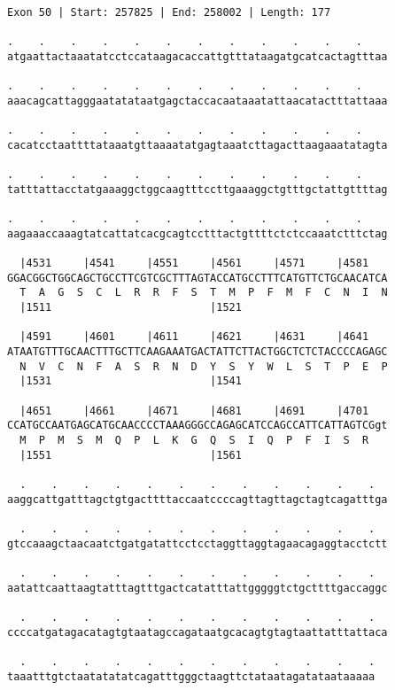 \documentclass{article}
\begin{document}
\newpage
\begin{Verbatim}[fontfamily=courier]
Exon 50 | Start: 257825 | End: 258002 | Length: 177

.    .    .    .    .    .    .    .    .    .    .    .    
atgaattactaaatatcctccataagacaccattgtttataagatgcatcactagtttaa

.    .    .    .    .    .    .    .    .    .    .    .    
aaacagcattagggaatatataatgagctaccacaataaatattaacatactttattaaa

.    .    .    .    .    .    .    .    .    .    .    .    
cacatcctaattttataaatgttaaaatatgagtaaatcttagacttaagaaatatagta

.    .    .    .    .    .    .    .    .    .    .    .    
tatttattacctatgaaaggctggcaagtttccttgaaaggctgtttgctattgttttag

.    .    .    .    .    .    .    .    .    .    .    .    
aagaaaccaaagtatcattatcacgcagtcctttactgttttctctccaaatctttctag

  |4531     |4541     |4551     |4561     |4571     |4581   
GGACGGCTGGCAGCTGCCTTCGTCGCTTTAGTACCATGCCTTTCATGTTCTGCAACATCA
  T  A  G  S  C  L  R  R  F  S  T  M  P  F  M  F  C  N  I  N
  |1511                         |1521                       

  |4591     |4601     |4611     |4621     |4631     |4641   
ATAATGTTTGCAACTTTGCTTCAAGAAATGACTATTCTTACTGGCTCTCTACCCCAGAGC
  N  V  C  N  F  A  S  R  N  D  Y  S  Y  W  L  S  T  P  E  P
  |1531                         |1541                       

  |4651     |4661     |4671     |4681     |4691     |4701   
CCATGCCAATGAGCATGCAACCCCTAAAGGGCCAGAGCATCCAGCCATTCATTAGTCGgt
  M  P  M  S  M  Q  P  L  K  G  Q  S  I  Q  P  F  I  S  R   
  |1551                         |1561                       

  .    .    .    .    .    .    .    .    .    .    .    .  
aaggcattgatttagctgtgacttttaccaatccccagttagttagctagtcagatttga

  .    .    .    .    .    .    .    .    .    .    .    .  
gtccaaagctaacaatctgatgatattcctcctaggttaggtagaacagaggtacctctt

  .    .    .    .    .    .    .    .    .    .    .    .  
aatattcaattaagtatttagtttgactcatatttattgggggtctgcttttgaccaggc

  .    .    .    .    .    .    .    .    .    .    .    .  
ccccatgatagacatagtgtaatagccagataatgcacagtgtagtaattatttattaca

  .    .    .    .    .    .    .    .    .    .    .    .
taaatttgtctaatatatatcagatttgggctaagttctataatagatataataaaaa
\end{Verbatim}
\end{document}
